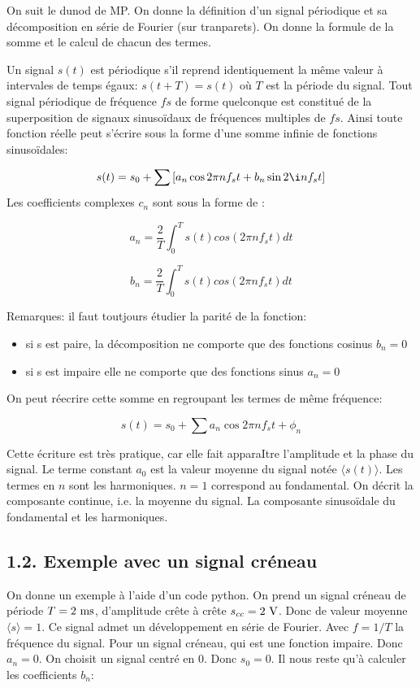 \documentclass[french, a4paper, 10pt, twocolumn, landscape]{article}
\begin{document}
On suit le dunod de MP. On donne la définition d'un signal périodique et sa décomposition en série de Fourier (sur tranparets). On donne la formule de la somme et le calcul de chacun des termes.\medskip

Un signal $s(t)$ est périodique s'il reprend identiquement la même valeur à intervales de temps égaux: $s(t+T)=s(t)$ où $T$ est la période du signal. Tout signal périodique de fréquence $fs$ de forme quelconque est constitué de la superposition de signaux sinusoïdaux de fréquences multiples de $fs$. Ainsi toute fonction réelle peut s'écrire sous la forme d'une somme infinie de fonctions sinusoïdales: 

\begin{equation}
  s(t)=s_0+\sum \left[a_n\cos{2\pi nf_st} + b_n\sin{2\i n f_st}\right]
\end{equation}
Les coefficients complexes $c_n$ sont sous la forme de :

$$  a_n = \dfrac{2}{T}\int_{0}^T{s(t)cos(2\pi nf_s t)dt}$$

$$  b_n = \dfrac{2}{T}\int_{0}^T{s(t)cos(2\pi nf_s t)dt}$$

Remarques: il faut toutjours étudier la parité de la fonction:
\begin{itemize}
  \item si s est paire, la décomposition ne comporte que des fonctions cosinus $b_n=0$
  \item si s est impaire elle ne comporte que des fonctions sinus $a_n =0$
\end{itemize}
On peut réecrire cette somme en regroupant les termes de même fréquence: 

\begin{equation}
  s(t)=s_0+\sum a_n\cos{2\pi nf_st+\phi_n}
\end{equation}

Cette écriture est très pratique, car elle fait apparaItre l'amplitude et la phase du signal. Le terme constant $a_0$ est la valeur moyenne du signal notée $\langle s(t) \rangle$. Les termes en $n$ sont les harmoniques. $n=1$ correspond au fondamental. On décrit la composante continue, i.e. la moyenne du signal. La composante sinusoïdale du fondamental et les harmoniques.

\subsection*{1.2. Exemple avec un signal créneau}
On donne un exemple à l'aide d'un code python. On prend un signal créneau de période $T=2~\rm ms$, d'amplitude crête à crête $s_{cc}=2~\rm V$. Donc de valeur moyenne $\langle s\rangle = 1$. Ce signal admet un développement en série de Fourier. Avec $f=1/T$ la fréquence du signal. Pour un signal créneau, qui est une fonction impaire. Donc $a_n=0$. On choisit un signal centré en $0$. Donc $s_0 = 0$. Il nous reste qu'à calculer les coefficients $b_n$: 
\end{document}
